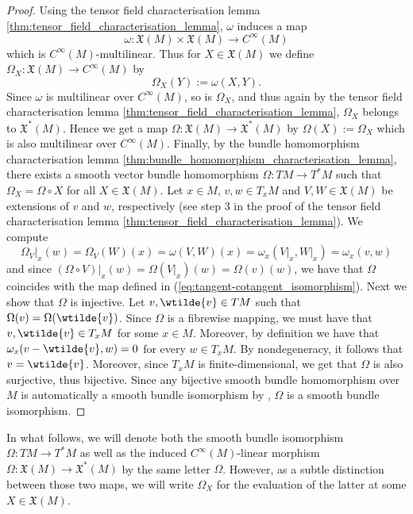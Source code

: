 \begin{proof}
	Using the tensor field characterisation lemma \ref{thm:tensor_field_characterisation_lemma}, $\omega$ induces a map 
	\begin{equation*}
		\omega : \mathfrak{X}(M) \times \mathfrak{X}(M) \to C^\infty(M)
	\end{equation*}
	\noindent which is $C^\infty(M)$-multilinear. Thus for $X \in \mathfrak{X}(M)$ we define $\Omega_X : \mathfrak{X}(M) \to C^\infty(M)$ by
	\begin{equation*}
		\Omega_X(Y) := \omega(X,Y).
	\end{equation*}
	Since $\omega$ is multilinear over $C^\infty(M)$, so is $\Omega_X$, and thus again by the tensor field characterisation lemma \ref{thm:tensor_field_characterisation_lemma}, $\Omega_X$ belongs to $\mathfrak{X}^*(M)$. Hence we get a map $\Omega : \mathfrak{X}(M) \to \mathfrak{X}^*(M)$ by $\Omega(X) := \Omega_X$ which is also multilinear over $C^\infty(M)$. Finally, by the bundle homomorphism characterisation lemma \ref{thm:bundle_homomorphism_characterisation_lemma}, there exists a smooth vector bundle homomorphism $\Omega : TM \to T^*M$ such that $\Omega_X = \Omega \circ X$ for all $X \in \mathfrak{X}(M)$. Let $x \in M$, $v,w \in T_xM$ and $V,W \in \mathfrak{X}(M)$ be extensions of $v$ and $w$, respectively (see step 3 in the proof of the tensor field characterisation lemma \ref{thm:tensor_field_characterisation_lemma}). We compute
	\begin{equation*}
		\Omega_V\vert_x(w) = \Omega_V(W)(x) = \omega(V,W)(x) = \omega_x(V\vert_x,W\vert_x) = \omega_x(v,w)
	\end{equation*}
	\noindent and since $(\Omega \circ V)\vert_x(w) = \Omega(V\vert_x)(w) = \Omega(v)(w)$, we have that $\Omega$ coincides with the map defined in (\ref{eq:tangent-cotangent_isomorphism}). Next we show that $\Omega$ is injective. Let $v,\wtilde{v} \in TM$ such that $\Omega(v) = \Omega(\wtilde{v})$. Since $\Omega$ is a fibrewise mapping, we must have that $v,\wtilde{v} \in T_xM$ for some $x \in M$. Moreover, by definition we have that $\omega_x(v - \wtilde{v},w) = 0$ for every $w \in T_xM$. By nondegeneracy, it follows that $v = \wtilde{v}$. Moreover, since $T_xM$ is finite-dimensional, we get that $\Omega$ is also surjective, thus bijective. Since any bijective smooth bundle homomorphism over $M$ is automatically a smooth bundle isomorphism by \cite[262]{lee:smooth_manifolds:2013}, $\Omega$ is a smooth bundle isomorphism.
\end{proof}

\begin{remark}
	In what follows, we will denote both the smooth bundle isomorphism $\Omega : TM \to T^*M$ as well as the induced $C^\infty(M)$-linear morphism $\Omega : \mathfrak{X}(M) \to \mathfrak{X}^*(M)$ by the same letter $\Omega$. However, as a subtle distinction between those two maps, we will write $\Omega_X$ for the evaluation of the latter at some $X \in \mathfrak{X}(M)$.
\end{remark}
